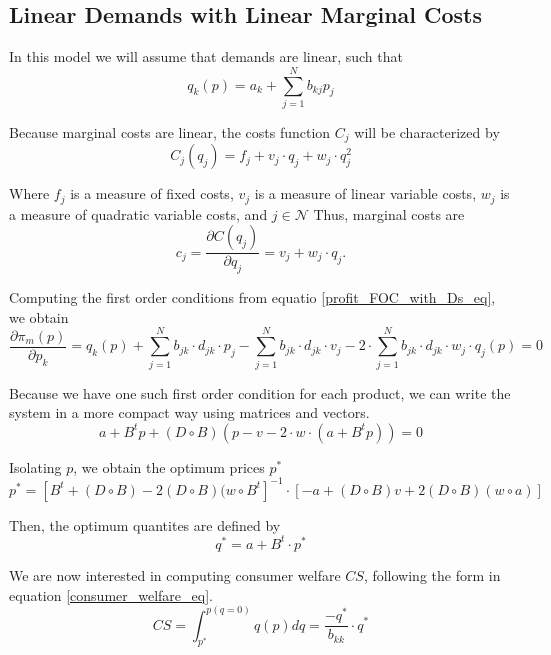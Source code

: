 \documentclass[12pt]{article}
\begin{document}
\subsection{Linear Demands with Linear Marginal Costs}

In this model we will assume that demands are linear, such that
\begin{equation*}
q_k(p) = a_k + \sum_{j=1}^N b_{kj}p_j
\end{equation*}

Because marginal costs are linear, the costs function $C_j$ will be characterized by
\begin{equation*}
C_j(q_j) = f_j + v_j \cdot q_j + w_j \cdot q_j^2
\end{equation*}

Where $f_j$ is a measure of fixed costs, $v_j$ is a measure of linear variable costs, $w_j$ is a measure of quadratic variable costs, and $j \in \mathcal{N}$ Thus, marginal costs are
\begin{equation*}
c_j = \frac{\partial C(q_j)}{\partial q_j}= v_j + w_j \cdot q_j.
\end{equation*}

Computing the first order conditions from equatio \ref{profit_FOC_with_Ds_eq}, we obtain
\begin{equation*}
\frac{\partial\pi_m(p)}{\partial p_k} = q_k(p) + \sum_{j = 1}^N b_{jk} \cdot d_{jk} \cdot p_j - \sum_{j = 1}^N b_{jk} \cdot d_{jk} \cdot v_j - 2 \cdot \sum_{j = 1}^N b_{jk} \cdot d_{jk} \cdot w_j \cdot q_j (p) = 0
\end{equation*}

Because we have one such first order condition for each product, we can write the system in a more compact way using matrices and vectors. 
\begin{equation*}
a + B ^ t p + (D \circ B)(p - v - 2 \cdot w \cdot (a + B^t p)) = 0
\end{equation*}

Isolating $p$, we obtain the optimum prices $p^*$
\begin{equation*}
p^* = [B^t + (D \circ B) - 2 (D \circ B)(w \circ B^t]^{-1} \cdot [-a + (D \circ B) v + 2 (D \circ B)(w \circ a)]
\end{equation*}

Then, the optimum quantites are defined by
\begin{equation*}
q^* = a + B^t \cdot p^*
\end{equation*}

We are now interested in computing consumer welfare $CS$, following the form in equation \ref{consumer_welfare_eq}.
\begin{equation*}
CS = \int_{p^*}^{p(q = 0)} q(p) dq = \frac{-q^*}{b_{kk}} \cdot q^*
\end{equation*}
\end{document}
